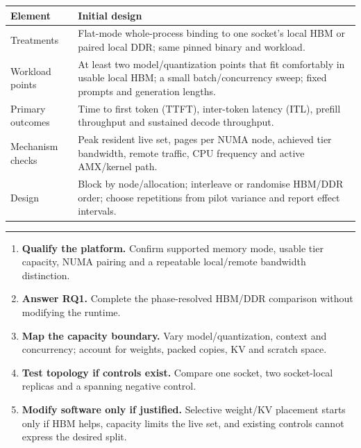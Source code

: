 \documentclass[10pt,a4paper]{article}
\newcommand{\researchq}[1]{\textbf{RQ#1}}
\newcommand{\heading}[1]{%
  \vspace{4pt}{\large\bfseries\color{accent}#1}\par
  \vspace{1pt}\hrule height 0.35pt\vspace{4pt}}
\begin{document}
\begin{table}[h]
\centering
\small
\begin{tabularx}{\textwidth}{@{}P{3.4cm}Y@{}}
\toprule
\textbf{Element} & \textbf{Initial design} \\
\midrule
Treatments
& Flat-mode whole-process binding to one socket's local HBM or paired
  local DDR; same pinned binary and workload. \\
Workload points
& At least two model/quantization points that fit comfortably in usable
  local HBM; a small batch/concurrency sweep; fixed prompts and
  generation lengths. \\
Primary outcomes
& Time to first token (TTFT), inter-token latency (ITL), prefill
  throughput and sustained decode throughput. \\
Mechanism checks
& Peak resident live set, pages per NUMA node, achieved tier bandwidth,
  remote traffic, CPU frequency and active AMX/kernel path. \\
Design
& Block by node/allocation; interleave or randomise HBM/DDR order;
  choose repetitions from pilot variance and report effect intervals. \\
\bottomrule
\end{tabularx}
\end{table}

\heading{Decision gates}

\begin{enumerate}
  \item \textbf{Qualify the platform.}  Confirm supported memory mode,
        usable tier capacity, NUMA pairing and a repeatable local/remote
        bandwidth distinction.
  \item \textbf{Answer \researchq{1}.}  Complete the phase-resolved HBM/DDR
        comparison without modifying the runtime.
  \item \textbf{Map the capacity boundary.}  Vary model/quantization,
        context and concurrency; account for weights, packed copies, KV
        and scratch space.
  \item \textbf{Test topology if controls exist.}  Compare one socket,
        two socket-local replicas and a spanning negative control.
  \item \textbf{Modify software only if justified.}  Selective
        weight/KV placement starts only if HBM helps, capacity limits
        the live set, and existing controls cannot express the desired
        split.
\end{enumerate}
\end{document}
